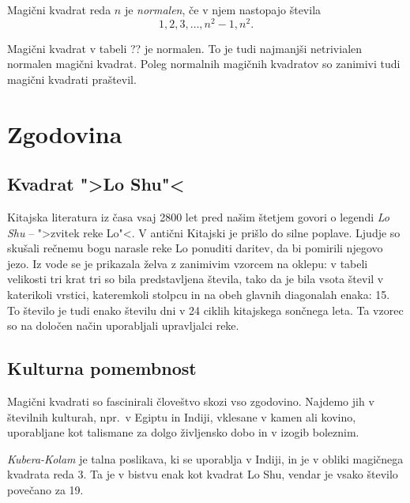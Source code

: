 \documentclass[a4paper,12pt]{article}
\begin{document}

   Magični kvadrat reda \(n\) je \emph{normalen}, če v njem nastopajo števila
   \begin{equation}
      1, 2, 3, \ldots, n^2-1, n^2.
   \end{equation}

Magični kvadrat v tabeli ?? je normalen.
To je tudi najmanjši netrivialen normalen magični kvadrat.
Poleg normalnih magičnih kvadratov so zanimivi tudi magični kvadrati praštevil. %


\section{Zgodovina}

\subsection{Kvadrat ">Lo Shu"<}

Kitajska literatura iz časa vsaj 2800 let pred našim štetjem govori o legendi
\emph{Lo Shu} -- ">zvitek reke Lo"<. V antični Kitajski je prišlo do
silne poplave. Ljudje so skušali rečnemu bogu narasle reke Lo ponuditi daritev,
da bi pomirili njegovo jezo. Iz vode se je prikazala želva z zanimivim vzorcem
na oklepu: v tabeli velikosti tri krat tri so bila predstavljena števila, tako
da je bila vsota števil v katerikoli vrstici, kateremkoli stolpcu in na obeh
glavnih diagonalah enaka: 15. To število je tudi enako številu dni v 24 ciklih
kitajskega sončnega leta. Ta vzorec so na določen način uporabljali upravljalci
reke.


\subsection{Kulturna pomembnost}

Magični kvadrati so fascinirali človeštvo skozi vso zgodovino. Najdemo jih
v številnih kulturah, npr.\ v Egiptu in Indiji, vklesane v kamen ali
kovino, uporabljane kot talismane za dolgo življensko dobo in v
izogib boleznim.

\emph{Kubera-Kolam} je talna poslikava, ki se uporablja v Indiji, in je v
obliki magičnega kvadrata reda 3. Ta je v bistvu enak kot kvadrat
Lo Shu, vendar je vsako število povečano za 19.
\end{document}
